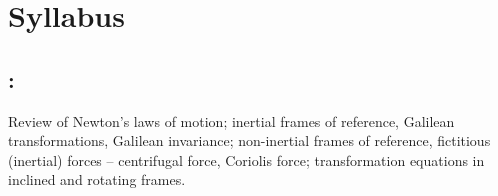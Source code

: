 
\thispagestyle{empty}

\section*{Syllabus}

    \subsection*{\topicSubTitle: \topicTitle}
        Review of Newton's laws of motion; inertial frames of reference, Galilean transformations, Galilean invariance; non-inertial frames of reference, fictitious (inertial) forces -- centrifugal force, Coriolis force; transformation equations in inclined and rotating frames.
        
\setcounter{page}{1}